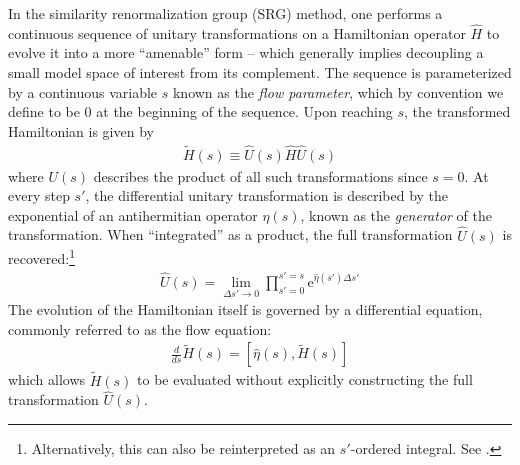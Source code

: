 In the similarity renormalization group (SRG) method, one performs a
continuous sequence of unitary transformations on a Hamiltonian operator
$\hat H$ to evolve it into a more ``amenable'' form -- which generally implies
decoupling a small model space of interest from its complement.  The sequence
is parameterized by a continuous variable $s$ known as the \textit{flow
  parameter}, which by convention we define to be $0$ at the beginning of the
sequence.  Upon reaching $s$, the transformed Hamiltonian is given by
\begin{align*}
  \tilde H(s) \equiv \hat U(s) \hat H \hat U(s)
\end{align*}
where $U(s)$ describes the product of all such transformations since $s = 0$.
At every step $s'$, the differential unitary transformation is described by
the exponential of an antihermitian operator $\eta(s)$, known as the
\textit{generator} of the transformation.  When ``integrated'' as a product,
the full transformation $\hat U(s)$ is recovered:\footnote{Alternatively, this
  can also be reinterpreted as an $s'$-ordered integral.  See \cite[\S
  6.1]{reimann2013quantum}.}
\begin{align*}
  \hat U(s) = \lim_{\Delta s' \to 0} \prod_{s' = 0}^{s' = s}
  \mathrm e^{\hat \eta(s') \Delta s'}
\end{align*}
The evolution of the Hamiltonian itself is governed by a differential
equation, commonly referred to as the flow equation:
\begin{gather} \label{eq:imsrgode}
  \frac{d}{d s} \tilde H(s) = [\hat \eta(s), \tilde H(s)]
\end{gather}
which allows $\tilde H(s)$ to be evaluated without explicitly constructing the
full transformation $\hat U(s)$.

